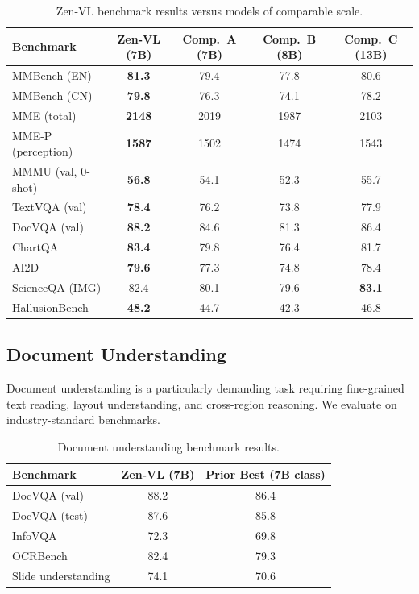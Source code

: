 \documentclass[11pt,a4paper]{article}
\begin{document}
\begin{table}[H]
\centering
\caption{Zen-VL benchmark results versus models of comparable scale.}
\label{tab:benchmarks}
\begin{tabular}{lcccc}
\toprule
\textbf{Benchmark} & \textbf{Zen-VL (7B)} & \textbf{Comp.\ A (7B)} & \textbf{Comp.\ B (8B)} & \textbf{Comp.\ C (13B)} \\
\midrule
MMBench (EN)         & \textbf{81.3} & 79.4 & 77.8 & 80.6 \\
MMBench (CN)         & \textbf{79.8} & 76.3 & 74.1 & 78.2 \\
MME (total)          & \textbf{2148} & 2019 & 1987 & 2103 \\
MME-P (perception)   & \textbf{1587} & 1502 & 1474 & 1543 \\
MMMU (val, 0-shot)   & \textbf{56.8} & 54.1 & 52.3 & 55.7 \\
\midrule
TextVQA (val)        & \textbf{78.4} & 76.2 & 73.8 & 77.9 \\
DocVQA (val)         & \textbf{88.2} & 84.6 & 81.3 & 86.4 \\
ChartQA              & \textbf{83.4} & 79.8 & 76.4 & 81.7 \\
AI2D               & \textbf{79.6} & 77.3 & 74.8 & 78.4 \\
\midrule
ScienceQA (IMG)      & 82.4 & 80.1 & 79.6 & \textbf{83.1} \\
HallusionBench       & \textbf{48.2} & 44.7 & 42.3 & 46.8 \\
\bottomrule
\end{tabular}
\end{table}

\subsection{Document Understanding}

Document understanding is a particularly demanding task requiring fine-grained text reading,
layout understanding, and cross-region reasoning. We evaluate on industry-standard benchmarks.

\begin{table}[H]
\centering
\caption{Document understanding benchmark results.}
\label{tab:doc}
\begin{tabular}{lcc}
\toprule
\textbf{Benchmark} & \textbf{Zen-VL (7B)} & \textbf{Prior Best (7B class)} \\
\midrule
DocVQA (val)        & 88.2 & 86.4 \\
DocVQA (test)       & 87.6 & 85.8 \\
InfoVQA             & 72.3 & 69.8 \\
OCRBench            & 82.4 & 79.3 \\
Slide understanding & 74.1 & 70.6 \\
\bottomrule
\end{tabular}
\end{table}
\end{document}
